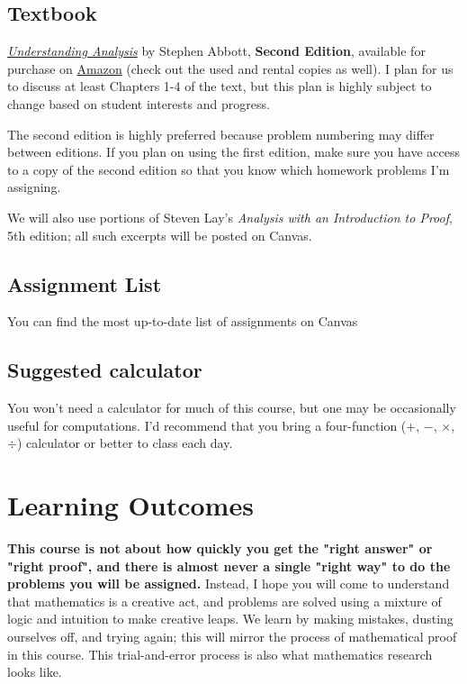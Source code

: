 \documentclass[11pt, a4paper]{article}
\begin{document}
\subsection*{Textbook} {\it \href{https://www.springer.com/us/book/9781493927111}{Understanding Analysis}} by Stephen Abbott, \textbf{Second Edition}, available for purchase on \href{https://www.amazon.com/Understanding-Analysis-Undergraduate-Texts-Mathematics/dp/1493927116}{Amazon} (check out the used and rental copies as well). I plan for us to discuss at least Chapters 1-4 of the text, but this plan is highly subject to change based on student interests and progress.

The second edition is highly preferred because problem numbering may differ between editions. If you plan on using the first edition, make sure you have access to a copy of the second edition so that you know which homework problems I'm assigning.

We will also use portions of Steven Lay's \textit{Analysis with an Introduction to Proof}, 5th edition; all such excerpts will be posted on Canvas.

\subsection*{Assignment List} You can find the most up-to-date list of assignments on Canvas%
\subsection*{Suggested calculator} You won't need a calculator for much of this course, but one may be occasionally useful for computations. I'd recommend that you bring a four-function ($+$, $-$, $\times$, $\div$) calculator or better to class each day.

\bigskip

\section*{Learning Outcomes}
\textbf{This course is not about how quickly you get the "right answer" or "right proof", and there is almost never a single "right way" to do the problems you will be assigned.} Instead, I hope you will come to understand that mathematics is a creative act, and problems are solved using a mixture of logic and intuition to make creative leaps. We learn by making mistakes, dusting ourselves off, and trying again; this will mirror the process of mathematical proof in this course. This trial-and-error process is also what mathematics research looks like.
\end{document}
